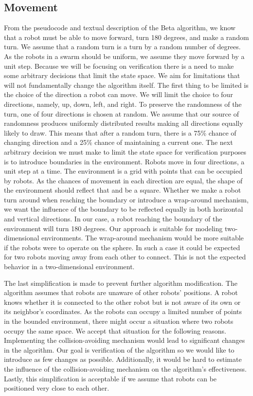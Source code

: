 \subsection{Movement}
From the pseudocode and textual description of the Beta algorithm, we know that a robot must be able to move forward, turn 180 degrees, and make a random turn. We assume that a random turn is a turn by a random number of degrees. As the robots in a swarm should be uniform, we assume they move forward by a unit step. Because we will be focusing on verification there is a need to make some arbitrary decisions that limit the state space. We aim for limitations that will not fundamentally change the algorithm itself. The first thing to be limited is the choice of the direction a robot can move. We will limit the choice to four directions, namely, up, down, left, and right. To preserve the randomness of the turn, one of four directions is chosen at random. We assume that our source of randomness produces uniformly distributed results making all directions equally likely to draw. This means that after a random turn, there is a 75\% chance of changing direction and a 25\% chance of maintaining a current one. 
\noindent
The next arbitrary decision we must make to limit the state space for verification purposes is to introduce boundaries in the environment. Robots move in four directions, a unit step at a time. The environment is a grid with points that can be occupied by robots. As the chances of movement in each direction are equal, the shape of the environment should reflect that and be a square. Whether we make a robot turn around when reaching the boundary or introduce a wrap-around mechanism, we want the influence of the boundary to be reflected equally in both horizontal and vertical directions. In our case, a robot reaching the boundary of the environment will turn 180 degrees. Our approach is suitable for modeling two-dimensional environments. The wrap-around mechanism would be more suitable if the robots were to operate on the sphere. In such a case it could be expected for two robots moving away from each other to connect. This is not the expected behavior in a two-dimensional environment.

The last simplification is made to prevent further algorithm modification. The algorithm assumes that robots are unaware of other robots' positions. A robot knows whether it is connected to the other robot but is not aware of its own or its neighbor's coordinates. As the robots can occupy a limited number of points in the bounded environment, there might occur a situation where two robots occupy the same space. We accept that situation for the following reasons. Implementing the collision-avoiding mechanism would lead to significant changes in the algorithm. Our goal is verification of the algorithm so we would like to introduce as few changes as possible. Additionally, it would be hard to estimate the influence of the collision-avoiding mechanism on the algorithm's effectiveness. Lastly, this simplification is acceptable if we assume that robots can be positioned very close to each other.



